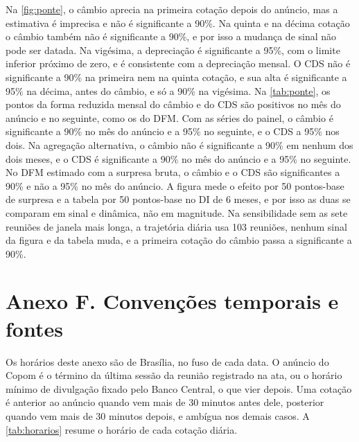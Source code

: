 \documentclass[preprint,authoryear,review,12pt]{elsarticle}
\begin{document}
Na \autoref{fig:ponte}, o câmbio aprecia na primeira cotação depois do anúncio, mas a estimativa é imprecisa e não é significante a 90\%. Na quinta e na décima cotação o câmbio também não é significante a 90\%, e por isso a mudança de sinal não pode ser datada. Na vigésima, a depreciação é significante a 95\%, com o limite inferior próximo de zero, e é consistente com a depreciação mensal. O CDS não é significante a 90\% na primeira nem na quinta cotação, e sua alta é significante a 95\% na décima, antes do câmbio, e só a 90\% na vigésima. Na \autoref{tab:ponte}, os pontos da forma reduzida mensal do câmbio e do CDS são positivos no mês do anúncio e no seguinte, como os do DFM. Com as séries do painel, o câmbio é significante a 90\% no mês do anúncio e a 95\% no seguinte, e o CDS a 95\% nos dois. Na agregação alternativa, o câmbio não é significante a 90\% em nenhum dos dois meses, e o CDS é significante a 90\% no mês do anúncio e a 95\% no seguinte. No DFM estimado com a surpresa bruta, o câmbio e o CDS são significantes a 90\% e não a 95\% no mês do anúncio. A figura mede o efeito por 50 pontos-base de surpresa e a tabela por 50 pontos-base no DI de 6 meses, e por isso as duas se comparam em sinal e dinâmica, não em magnitude. Na sensibilidade sem as sete reuniões de janela mais longa, a trajetória diária usa 103 reuniões, nenhum sinal da figura e da tabela muda, e a primeira cotação do câmbio passa a significante a 90\%.

\section*{Anexo F. Convenções temporais e fontes}\label{anexo-F}

Os horários deste anexo são de Brasília, no fuso de cada data. O anúncio do Copom é o término da última sessão da reunião registrado na ata, ou o horário mínimo de divulgação fixado pelo Banco Central, o que vier depois. Uma cotação é anterior ao anúncio quando vem mais de 30 minutos antes dele, posterior quando vem mais de 30 minutos depois, e ambígua nos demais casos. A \autoref{tab:horarios} resume o horário de cada cotação diária.
\end{document}
